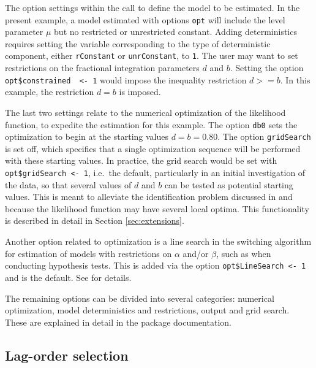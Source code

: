 \documentclass[article]{jss}
\newcommand{\fct}[1]{\code{#1()}}
\begin{document}
The option settings within the call to \fct{FCVARoptions} define the model to be estimated. 
In the present example, a model estimated with options \verb|opt| will include the level parameter $\mu$ but no restricted or unrestricted constant. 
Adding deterministics requires setting the variable corresponding to the type of deterministic component, either \verb|rConstant| or \verb|unrConstant|, to \verb|1|. 
% 
The user may want to set restrictions on the fractional integration parameters $d$ and $b$. 
Setting the option \verb|opt$constrained  <- 1| would impose the inequality restriction $d >= b$. 
In this example, the restriction $d = b$ is imposed. 

The last two settings relate to the numerical optimization of the likelihood function, to expedite the estimation for this example. 
The option \verb|db0| sets the optimization to begin at the starting values $d = b = 0.80$. 
The option \verb|gridSearch| is set off, which specifies that a single optimization sequence will be performed with these starting values. 
In practice, the grid search would be set with  \verb|opt$gridSearch <- 1|, i.e.~the default, particularly in an initial investigation of the data, 
so that several values of $d$ and $b$ can be tested as potential starting values. 
This is meant to alleviate the identification problem discussed in \citet[Section 2.3]{johniel2010} and \cite{Carlini2014} because the likelihood function may have several local optima. 
This functionality is described in detail in Section \ref{sec:extensions}. 

Another option related to optimization is a line search in the switching algorithm for estimation of models with restrictions on $\alpha$ and/or $\beta$, such as when conducting hypothesis tests. 
This is added via the option \verb|opt$LineSearch <- 1| and is the default. See \citet[Section 2.2]{Doornik2016} for details. 

The remaining options can be divided into several categories: numerical optimization, model deterministics and restrictions, output and grid search. 
These are explained in detail in the package documentation. 





\subsection{Lag-order selection}
\end{document}
